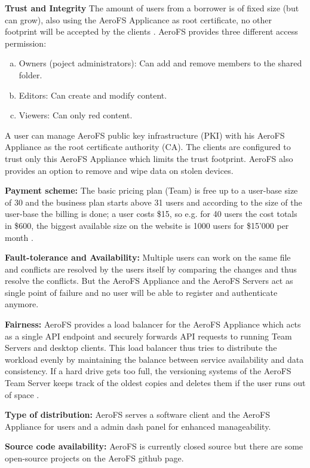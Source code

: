 \textbf{Trust and Integrity} The amount of users from a borrower is of fixed size (but can grow), also using the AeroFS Applicance as root certificate, no other footprint will be accepted by the clients \cite{aerofs:security}. AeroFS provides three different access permission:
\begin{enumerate}[(a)]
\item Owners (poject administrators): Can add and remove members to the shared folder.
\item Editors: Can create and modify content.
\item Viewers: Can only red content.
\end{enumerate}
A user can manage AeroFS  public key infrastructure (PKI) with his AeroFS Appliance as the root certificate authority (CA). The clients are configured to trust only this AeroFS Appliance which limits the trust footprint. AeroFS also provides an option to remove and wipe data on stolen devices.

\textbf{Payment scheme:} The basic pricing plan (Team) is free up to a user-base size of 30 \cite{aerofs:blog:30_users_free} and the business plan starts above 31 users and according to the size of the user-base the billing is done; a user costs \$15, so e.g. for 40 users the cost totals in \$600, the biggest available size on the website is 1000 users for \$15'000 per month \cite{aerofs:pricing}.

\textbf{Fault-tolerance and Availability:} Multiple users can work on the same file and conflicts are resolved by the users itself by comparing the changes and thus resolve the conflicts. But the AeroFS Appliance and the AeroFS Servers act as single point of failure and no user will be able to register and authenticate anymore.

\textbf{Fairness:} AeroFS provides a load balancer for the AeroFS Appliance which acts as a single API endpoint and securely forwards API requests to running Team Servers and desktop clients. This load balancer thus tries to distribute the workload evenly by maintaining the balance between service availability and data consistency.
If a hard drive gets too full, the versioning systems of the AeroFS Team Server keeps track of the oldest copies and deletes them if the user runs out of space \cite{aerofs:USTO.RE}.

\textbf{Type of distribution:} AeroFS serves a software client and the AeroFS Appliance for users and a admin dash panel for enhanced manageability.

\textbf{Source code availability:} AeroFS is currently closed source but there are some open-source projects on the AeroFS github page.

